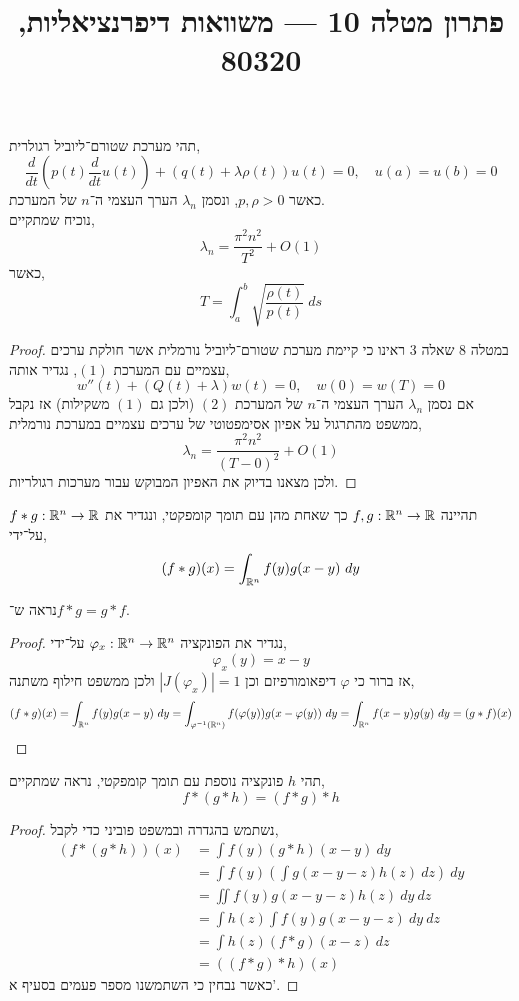 
\title{פתרון מטלה 10 --- משוואות דיפרנציאליות, 80320}

\DeclareMathOperator\Div{div}

\usepackage{pgfplots, tikz, pgffor}
\usetikzlibrary{math}
\pgfplotsset{compat=1.18}


\maketitle
\maketitleprint[blue]{}

\question{}
תהי מערכת שטורם־ליוביל רגולרית,
\[
	\frac{d}{dt}(p(t) \frac{d}{dt} u(t)) + (q(t) + \lambda \rho(t)) u(t) = 0,
	\quad
	u(a) = u(b) = 0
	\tag{1}
\]
כאשר $p, \rho > 0$, ונסמן $\lambda_n$ הערך העצמי ה־$n$ של המערכת. \\
נוכיח שמתקיים,
\[
	\lambda_n
	= \frac{\pi^2 n^2}{T^2} + O(1)
\]
כאשר,
\[
	T
	= \int_{a}^{b} \sqrt{\frac{\rho(t)}{p(t)}}\ ds
\]
\begin{proof}
	במטלה 8 שאלה 3 ראינו כי קיימת מערכת שטורם־ליוביל נורמלית אשר חולקת ערכים עצמיים עם המערכת $(1)$, נגדיר אותה,
	\[
		w''(t) + (Q(t) + \lambda) w(t) = 0,
		\quad
		w(0) = w(T) = 0
		\tag{2}
	\]
	אם נסמן $\lambda_n$ הערך העצמי ה־$n$ של המערכת $(2)$ (ולכן גם $(1)$ משקילות) אז נקבל ממשפט מהתרגול על אפיון אסימפטוטי של ערכים עצמיים במערכת נורמלית,
	\[
		\lambda_n
		= \frac{\pi^2 n^2}{{(T - 0)}^2} + O(1)
	\]
	ולכן מצאנו בדיוק את האפיון המבוקש עבור מערכות רגולריות.
\end{proof}

\question{}
תהיינה $f, g : \mathbb{R}^n \to \mathbb{R}$ כך שאחת מהן עם תומך קומפקטי, ונגדיר את $f * g : \mathbb{R}^n \to \mathbb{R}$ על־ידי,
\[
	(f * g)(x)
	= \int_{\mathbb{R}^n} f(y) g(x - y)\ dy
\]

\subquestion{}
נראה ש־$f * g = g* f$.
\begin{proof}
	נגדיר את הפונקציה $\varphi_x : \mathbb{R}^n \to \mathbb{R}^n$ על־ידי,
	\[
		\varphi_x(y)
		= x - y
	\]
	אז ברור כי $\varphi$ דיפאומורפיזם וכן $|J(\varphi_x)| = 1$ ולכן ממשפט חילוף משתנה,
	\[
		(f * g)(x)
		= \int_{\mathbb{R}^n} f(y) g(x - y)\ dy
		= \int_{\varphi^{-1}(\mathbb{R}^n)} f(\varphi(y)) g(x - \varphi(y))\ dy
		= \int_{\mathbb{R}^n} f(x - y) g(y)\ dy
		= (g * f)(x)
	\]
\end{proof}

\subquestion{}
תהי $h$ פונקציה נוספת עם תומך קומפקטי,
נראה שמתקיים,
\[
	f * (g * h)
	= (f * g) * h
\]
\begin{proof}
	נשתמש בהגדרה ובמשפט פוביני כדי לקבל,
	\begin{align*}
		(f * (g * h))(x)
		& = \int f(y) (g * h)(x - y)\ dy \\
		& = \int f(y) \left( \int g(x - y - z) h(z)\ dz \right)\ dy \\
		& = \iint f(y) g(x - y - z) h(z)\ dy\ dz \\
		& = \int h(z) \int f(y) g(x - y - z)\ dy\ dz \\
		& = \int h(z) (f * g)(x - z)\ dz \\
		& = ((f * g) * h)(x)
	\end{align*}
	כאשר נבחין כי השתמשנו מספר פעמים בסעיף א'.
\end{proof}

